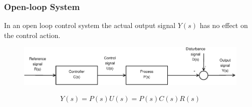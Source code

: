 \begin{frame}
	\frametitle{Open-loop System}
	\begin{definition}
		In an open loop control system the actual output signal $Y(s)$ has no effect on the control action.
		\vspace{-1em}
		\begin{figure}
			\centering
			\includegraphics[width=1\linewidth]{Open-Loop}
			\label{fig:Open-Loop}
		\end{figure}
		\begin{align*}
		Y(s) = P(s)U(s) = P(s)C(s)R(s) \\
		\end{align*}
	\end{definition}
\end{frame}

